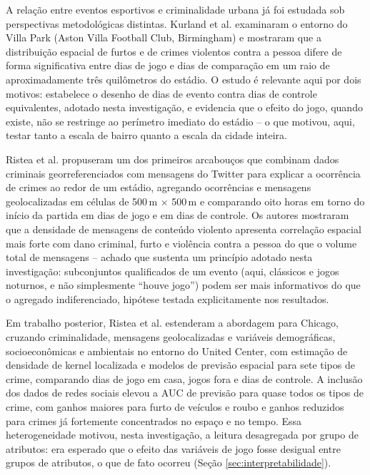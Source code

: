 \documentclass[12pt]{article}
\begin{document}
A relação entre eventos esportivos e criminalidade urbana já foi estudada
sob perspectivas metodológicas distintas. Kurland et al.
\cite{kurland2014} examinaram o entorno do Villa Park (Aston Villa
Football Club, Birmingham) e mostraram que a distribuição espacial de
furtos e de crimes violentos contra a pessoa difere de forma significativa
entre dias de jogo e dias de comparação em um raio de aproximadamente três
quilômetros do estádio. O estudo é relevante aqui por dois motivos:
estabelece o desenho de dias de evento contra dias de controle
equivalentes, adotado nesta investigação, e evidencia que o efeito do
jogo, quando existe, não se restringe ao perímetro imediato do estádio --
o que motivou, aqui, testar tanto a escala de bairro quanto a escala da
cidade inteira.

Ristea et al. \cite{ristea2018} propuseram um dos primeiros arcabouços que
combinam dados criminais georreferenciados com mensagens do Twitter para
explicar a ocorrência de crimes ao redor de um estádio, agregando
ocorrências e mensagens geolocalizadas em células de 500\,m $\times$
500\,m e comparando oito horas em torno do início da partida em dias de
jogo e em dias de controle. Os autores mostraram que a densidade de
mensagens de conteúdo violento apresenta correlação espacial mais forte
com dano criminal, furto e violência contra a pessoa do que o volume total
de mensagens -- achado que sustenta um princípio adotado nesta
investigação: subconjuntos qualificados de um evento (aqui, clássicos e
jogos noturnos, e não simplesmente ``houve jogo'') podem ser mais
informativos do que o agregado indiferenciado, hipótese testada
explicitamente nos resultados.

Em trabalho posterior, Ristea et al. \cite{ristea2020} estenderam a
abordagem para Chicago, cruzando criminalidade, mensagens geolocalizadas
e variáveis demográficas, socioeconômicas e ambientais no entorno do
United Center, com estimação de densidade de kernel localizada e modelos
de previsão espacial para sete tipos de crime, comparando dias de jogo em
casa, jogos fora e dias de controle. A inclusão dos dados de redes
sociais elevou a AUC de previsão para quase todos os tipos de crime, com
ganhos maiores para furto de veículos e roubo e ganhos reduzidos para
crimes já fortemente concentrados no espaço e no tempo. Essa
heterogeneidade motivou, nesta investigação, a leitura desagregada por
grupo de atributos: era esperado que o efeito das variáveis de jogo fosse
desigual entre grupos de atributos, o que de fato ocorreu (Seção
\ref{sec:interpretabilidade}).
\end{document}
